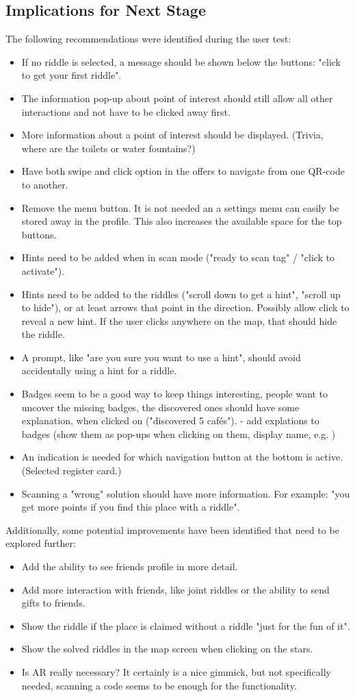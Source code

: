 \documentclass[10pt,twocolumn]{article} %
\begin{document}
\subsection*{Implications for Next Stage}
The following recommendations were identified during the user test:
\begin{itemize}[noitemsep]
  \item If no riddle is selected, a message should be shown below the buttons: "click to get your first riddle".
  \item The information pop-up about point of interest should still allow all other interactions and not have to be clicked away first.  
  \item More information about a point of interest should be displayed. (Trivia, where are the toilets or water fountains?)
  \item Have both swipe and click option in the offers to navigate from one QR-code to another.
  \item Remove the menu button. It is not needed an a settings menu can easily be stored away in the profile. This also increases the available space for the top buttons.  
  \item Hints need to be added when in scan mode ("ready to scan tag" / "click to activate").
  \item Hints need to be added to the riddles ("scroll down to get a hint", "scroll up to hide"), or at least arrows that point in the direction. Possibly allow click to reveal a new hint. If the user clicks anywhere on the map, that should hide the riddle.
  \item A prompt, like "are you sure you want to use a hint", should avoid accidentally using a hint for a riddle.
  \item Badges seem to be a good way to keep things interesting, people want to uncover the missing badges, the discovered ones should have some explanation, when clicked on ("discovered 5 cafés").
- add explations to badges (show them as pop-ups when clicking on them, display name, e.g. )
  \item An indication is needed for which navigation button at the bottom is active. (Selected register card.)
  \item Scanning a "wrong" solution should have more information. For example: "you get more points if you find this place with a riddle".
\end{itemize}
Additionally, some potential improvements have been identified that need to be explored further:
\begin{itemize}[noitemsep]
  \item Add the ability to see friends profile in more detail.
  \item Add more interaction with friends, like joint riddles or the ability to send gifts to friends.
  \item Show the riddle if the place is claimed without a riddle "just for the fun of it".
  \item Show the solved riddles in the map screen when clicking on the stars.
  \item Is AR really necessary? It certainly is a nice gimmick, but not specifically needed, scanning a code seems to be enough for the functionality.
\end{itemize}
\end{document}
